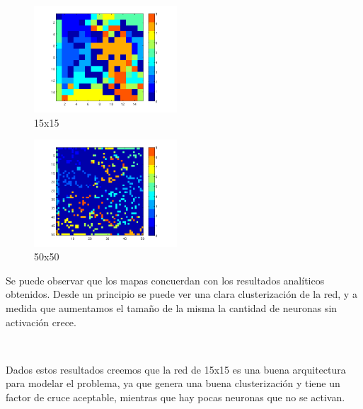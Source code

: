 \documentclass[informe.tex]{subfiles}
\begin{document}
       \begin{minipage}{0.30\textwidth}
	 \centering
	 \begin{figure}[H]
	  \centering
	    \includegraphics[height=4cm,keepaspectratio]{graficos/calor/calor_15x15.png}
		  \caption{\small 15x15}
	 \end{figure}
	 \begin{figure}[H]
	  \centering
	    \includegraphics[height=4cm,keepaspectratio]{graficos/calor/calor_50x50.png}
		  \caption{\small 50x50}
	 \end{figure}
       \end{minipage}     
       
       \vspace{20pt}
       
       Se puede observar que los mapas concuerdan con los resultados anal\'iticos obtenidos. Desde un principio se puede ver una clara clusterizaci\'on de la red, y a medida que aumentamos el tama\~no de la misma la cantidad de neuronas sin activaci\'on crece. 
       
       ~
       
       Dados estos resultados creemos que la red de 15x15 es una buena arquitectura para modelar el problema, ya que genera una buena clusterizaci\'on y tiene un factor de cruce aceptable, mientras que hay pocas neuronas que no se activan.
	
\end{document}
